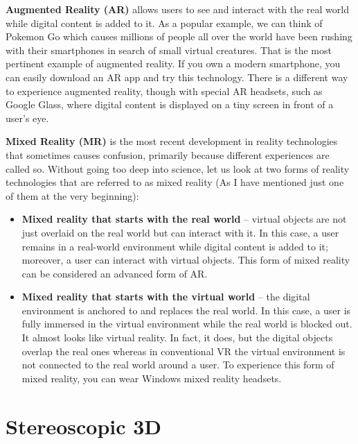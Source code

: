 \par \textbf{Augmented Reality (AR)} allows users to see and interact with the real world while digital content is added to it. As a popular example, we can think of Pokemon Go which causes millions of people all over the world have been rushing with their smartphones in search of small virtual creatures. That is the most pertinent example of augmented reality. \newline
If you own a modern smartphone, you can easily download an AR app and try this technology. There is a different way to experience augmented reality, though with special AR headsets, such as Google Glass, where digital content is displayed on a tiny screen in front of a user's eye.

\par \textbf{Mixed Reality (MR)} is the most recent development in reality technologies that sometimes causes confusion, primarily because different experiences are called so. Without going too deep into science, let us look at two forms of reality technologies that are referred to as mixed reality (As I have mentioned just one of them at the very beginning):

\begin{itemize}

\item \textbf{ Mixed reality that starts with the real world }– virtual objects are not just overlaid on the real world but can interact with it. In this case, a user remains in a real-world environment while digital content is added to it; moreover, a user can interact with virtual objects. This form of mixed reality can be considered an advanced form of AR.

\item  \textbf{Mixed reality that starts with the virtual world} – the digital environment is anchored to and replaces the real world. In this case, a user is fully immersed in the virtual environment while the real world is blocked out. It almost looks like virtual reality. In fact, it does, but the digital objects overlap the real ones whereas in conventional VR the virtual environment is not connected to the real world around a user. To experience this form of mixed reality, you can wear Windows mixed reality headsets. 
\end{itemize}

\section{Stereoscopic 3D}


